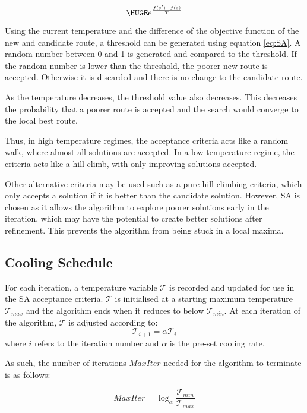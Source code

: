 \begin{equation} \label{eq:SA} \HUGE
e^{\frac{f(s')-f(s)}{\mathcal{T}}}
\end{equation}

Using the current temperature and the difference of the objective function of the new and candidate route, a threshold can be generated using equation \ref{eq:SA}. A random number between 0 and 1 is generated and compared to the threshold. If the random number is lower than the threshold, the poorer new route is accepted. Otherwise it is discarded and there is no change to the candidate route. 

As the temperature decreases, the threshold value also decreases. This decreases the probability that a poorer route is accepted and the search would converge to the local best route.

Thus, in high temperature regimes, the acceptance criteria acts like a random walk, where almost all solutions are accepted. In a low temperature regime, the criteria acts like a hill climb, with only improving solutions accepted.

Other alternative criteria may be used such as a pure hill climbing criteria, which only accepts a solution if it is better than the candidate solution. However, SA is chosen as it allows the algorithm to explore poorer solutions early in the iteration, which may have the potential to create better solutions after refinement. This prevents the algorithm from being stuck in a local maxima.

\subsection{Cooling Schedule}
For each iteration, a temperature variable $\mathcal{T}$ is recorded and updated for use in the SA acceptance criteria. $\mathcal{T}$ is initialised at a starting maximum temperature $\mathcal{T}_{max}$ and the algorithm ends when it reduces to below $\mathcal{T}_{min}$. At each iteration of the algorithm, $\mathcal{T}$ is adjusted according to:
\begin{equation}
\mathcal{T}_{i+1} = \alpha \mathcal{T}_{i}
\end{equation}
where $i$ refers to the iteration number and $\alpha$ is the pre-set cooling rate.

As such, the number of iterations $MaxIter$ needed for the algorithm to terminate is as follows:

\begin{equation}
MaxIter = \log_\alpha \frac{\mathcal{T}_{min}}{\mathcal{T}_{max}}
\end{equation}

